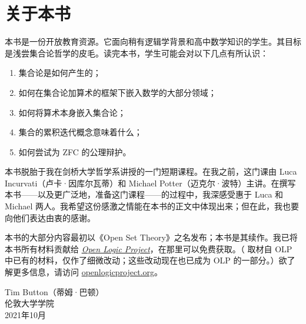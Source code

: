\chapter{关于本书}

本书是一份开放教育资源。它面向稍有逻辑学背景和高中数学知识的学生。其目标是浅尝集合论哲学的皮毛。读完本书，学生可能会对以下几点有所认识：

\begin{enumerate}
	\item 集合论是如何产生的；
	\item 如何在集合论加算术的框架下嵌入数学的大部分领域；
	\item 如何将算术本身嵌入集合论；
	\item 集合的累积迭代概念意味着什么；
	\item 如何尝试为 ZFC 的公理辩护。
\end{enumerate}

本书脱胎于我在剑桥大学哲学系讲授的一门短期课程。在我之前，这门课由 Luca Incurvati（卢卡·因库尔瓦蒂）和 Michael Potter（迈克尔·波特）主讲。在撰写本书——以及更广泛地，准备这门课程——的过程中，我深感受惠于 Luca 和 Michael 两人。我希望这份感激之情能在本书的正文中体现出来；但在此，我也要向他们表达由衷的感谢。

本书的大部分内容最初以《Open Set Theory》之名发布；本书是其续作。我已将本书所有材料贡献给 \href{http://openlogicproject.org}{\emph{Open Logic Project}}，在那里可以免费获取。（ 取材自 OLP 中已有的材料，仅作了细微改动；这些改动现在也已成为 OLP 的一部分。）欲了解更多信息，请访问 \href{http://openlogicproject.org/}{openlogicproject.org}。

\begin{flushright}
Tim Button（蒂姆·巴顿）
\\伦敦大学学院
\\2021年10月
\end{flushright}